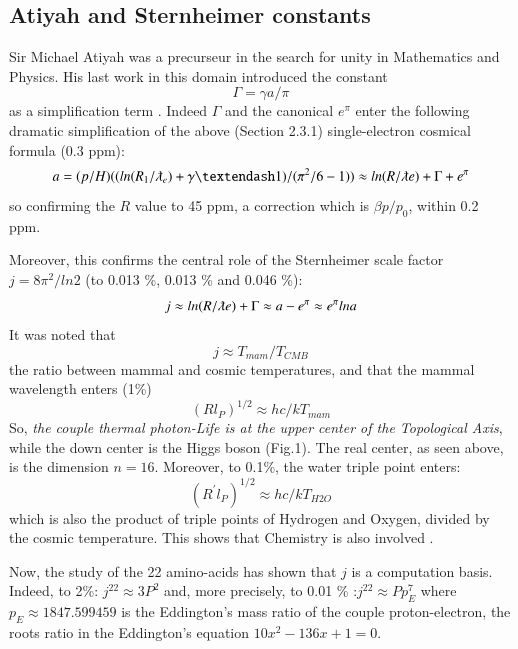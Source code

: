 \documentclass[twoside,draft]{article}
\begin{document}
\begin{sloppypar}
\subsection{Atiyah and Sternheimer constants}
    Sir Michael Atiyah was a precurseur in the search for unity in Mathematics and Physics. His last work in this domain introduced the constant $$\Gamma = \gamma a /\pi$$ as a simplification term \cite{Atiyah1}. Indeed $\Gamma$ and the canonical $e^{\pi}$ enter the following dramatic simplification of the above (Section 2.3.1) single-electron cosmical formula (0.3 ppm):    
\begin{equation}
a = (p/H)((ln(R_1/\lambdabar_e) + \gamma – 1)/(\pi^2/6 - 1)) \approx ln(R/\lambdabar e) + \Gamma + e^{\pi}
\end{equation}
so confirming the $R$ value to 45 ppm, a correction which is $\beta p/p_0$, within 0.2 ppm.

Moreover, this confirms the central role of the Sternheimer scale factor $j = 8\pi^2/ln2$ (to 0.013 \%, 0.013 \% and 0.046 \%):
\begin{equation}
j \approx ln(R/\lambdabar e) + \Gamma \approx a - e^{\pi} \approx e^{\pi} lna
\end{equation}
It was noted \cite{Sanchez1} that $$j\approx T_{mam}/T_{CMB}$$ the ratio between mammal and cosmic temperatures, and that the mammal wavelength enters (1\%) $$(Rl_P)^{1/2}\approx hc/kT_{mam}$$ So, \textit{the couple thermal photon-Life is at the upper center of the Topological Axis}, while the down center is the Higgs boson (Fig.1). The real center, as seen above, is the dimension $n = 16$. Moreover, to 0.1\%, the water triple point enters: $$(R^{\prime}l_P)^{1/2}\approx hc/kT_{H2O}$$ which is also the product of triple points of Hydrogen and Oxygen, divided by the cosmic temperature. This shows that Chemistry is also involved \cite{Sanchez1}.

Now, the study of the 22 amino-acids \cite{Sanchez1} has shown that $j$ is a computation basis. Indeed, to 2\%: $j^{22} \approx 3 P^2 $ and, more precisely, to 0.01 \% :$j^{22} \approx Pp_E^7 $ where $ p_E \approx 1847.599459$ is the Eddington's mass ratio of the couple proton-electron, the roots ratio in the Eddington's equation $10x^2 - 136x + 1 = 0 $.


\end{sloppypar}
\end{document}
